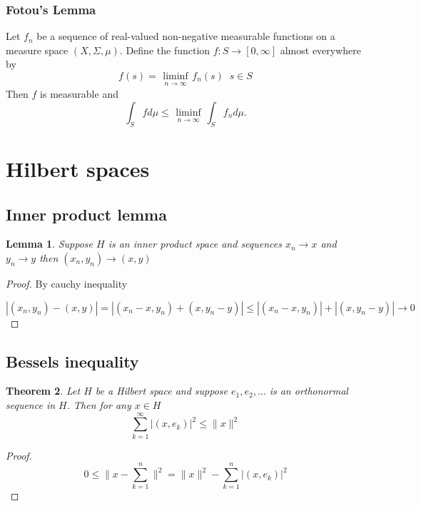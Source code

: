 \documentclass[titlepage]{article}
\newtheorem{thm}{Theorem}[section]
\newtheorem{lem}[thm]{Lemma}
\begin{document}
 \subsubsection{Fotou's Lemma}
  Let $f_n$ be a sequence of real-valued non-negative measurable functions on a measure space $(X,\Sigma, \mu)$. Define the function $f: S \rightarrow [0,\infty]$ almost everywhere by
  \begin{equation}
  f(s) = \liminf \limits_{\substack{n\rightarrow \infty}} f_n(s)\;\; s\in S
  \end{equation}
Then $f$ is measurable and 
\begin{equation}
\int_S fd\mu \leq \liminf \limits_{\substack{n\rightarrow \infty}}
\int_S f_n d\mu.
\end{equation}  
  \newpage



\section{Hilbert spaces}
\subsection{Inner product lemma}
\begin{lem}
Suppose $H$ is an inner product space and sequences $x_n \rightarrow x$ and $y_n \rightarrow y$ then $(x_n,y_n) \rightarrow (x,y)$ 
\end{lem}
\begin{proof}
By cauchy inequality

$|(x_n,y_n) - (x,y)| = |(x_n - x,y_n) + (x,y_n-y)| \leq |(x_n - x,y_n)| + |(x,y_n-y)| \rightarrow 0$
\end{proof}
\subsection{Bessels inequality}
\begin{thm}
Let $H$ be a Hilbert space and suppose $e_1, e_2, \ldots $ is an orthonormal sequence in $H$. Then for any $x \in H$ 
\begin{equation}
\sum_{k = 1}^\infty |(x,e_k)|^2 \leq \|x\| ^2
\end{equation}
\end{thm}
\begin{proof}
\begin{equation}
0 \leq \| x - \sum_{k = 1}^n \|^2 = \|x\|^2 - \sum_{k=1}^n|(x,e_k)|^2  
\end{equation}
\end{proof}
\end{document}
